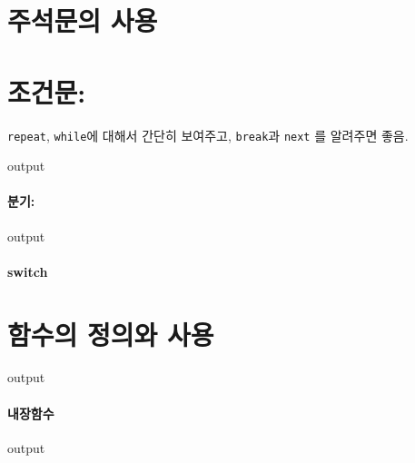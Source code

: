 \documentclass{book}
\begin{document}
\section{주석문의 사용}


\section{조건문:}
\texttt{repeat}, \texttt{while}에 대해서 간단히 보여주고, \texttt{break}과 \texttt{next} 를 알려주면 좋음. 
\begin{Schunk}
\begin{Soutput}
output
\end{Soutput}
\end{Schunk}


\paragraph{분기:}
\begin{Schunk}
\begin{Soutput}
output
\end{Soutput}
\end{Schunk}

\paragraph{switch}
\begin{Schunk}
\begin{Soutput}

\end{Soutput}
\end{Schunk}

\section{함수의 정의와 사용}
\begin{Schunk}
\begin{Soutput}
output
\end{Soutput}
\end{Schunk}

\paragraph{내장함수}
\begin{Schunk}
\begin{Soutput}
output
\end{Soutput}
\end{Schunk}
\end{document}

